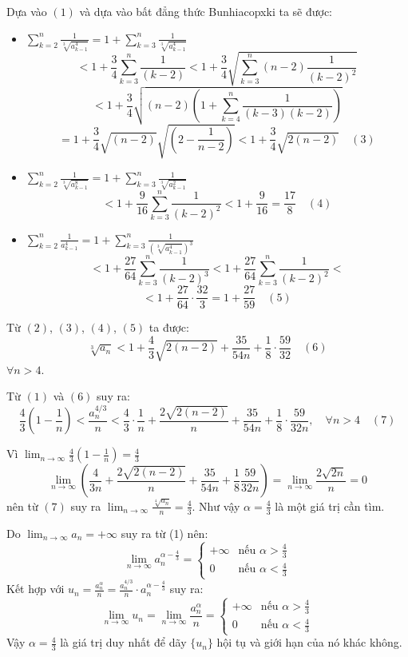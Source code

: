 \documentclass{article}
\begin{document}
Dựa vào $(1)$ và dựa vào bất đẳng thức Bunhiacopxki ta sẽ được:
\begin{itemize}
    \item $ \sum_{k=2}^{n} \frac{1}{\sqrt[3]{a_{k-1}^4}} = 1 + \sum_{k=3}^{n} \frac{1}{\sqrt[3]{a_{k-1}^4}} $
    $$ < 1 + \frac{3}{4}\sum_{k=3}^{n} \frac{1}{(k-2)} < 1 + \frac{3}{4}  \sqrt{\sum_{k=3}^{n} (n-2) \frac{1}{(k-2)^2}} $$
    $$ < 1 + \frac{3}{4} \sqrt{(n-2)(1 + \sum_{k=4}^{n} \frac{1}{(k-3)(k-2)})} $$
    $$ = 1 + \frac{3}{4} \sqrt{(n-2)} \sqrt{(2 - \frac{1}{n-2})} < 1 + \frac{3}{4} \sqrt{2(n-2)} \quad (3) $$

    \item $ \sum_{k=2}^{n} \frac{1}{\sqrt[3]{a_{k-1}^8}} = 1 + \sum_{k=3}^{n} \frac{1}{\sqrt[3]{a_{k-1}^2}} $
    $$ < 1 + \frac{9}{16} \sum_{k=3}^{n} \frac{1}{(k-2)^2} < 1 + \frac{9}{16} = \frac{17}{8} \quad (4) $$

    \item $ \sum_{k=2}^{n} \frac{1}{a_{k-1}^4} = 1 + \sum_{k=3}^{n} \frac{1}{(\sqrt[3]{a_{k-1}^4})^3} $
    $$ < 1 + \frac{27}{64} \sum_{k=3}^{n} \frac{1}{(k-2)^3} < 1 + \frac{27}{64} \sum_{k=3}^{n} \frac{1}{(k-2)^2} < $$
    $$ < 1 + \frac{27}{64} \cdot \frac{32}{3} = 1 + \frac{27}{59} \quad (5) $$
\end{itemize}

Từ $(2)$, $(3)$, $(4)$, $(5)$ ta được:
$$ \sqrt[3]{a_n} < 1 + \frac{4}{3} \sqrt{2(n-2)} + \frac{35}{54n} + \frac{1}{8} \cdot \frac{59}{32} \quad (6) $$
$\forall n > 4$.

Từ $(1)$ và $(6)$ suy ra:
$$ \frac{4}{3} \left(1 - \frac{1}{n}\right) < \frac{a_n^{4/3}}{n} < \frac{4}{3} \cdot \frac{1}{n} + \frac{2\sqrt{2(n-2)}}{n} + \frac{35}{54n} + \frac{1}{8} \cdot \frac{59}{32n}, \quad \forall n > 4 \quad (7) $$

Vì $\lim_{n \to \infty} \frac{4}{3} \left(1 - \frac{1}{n}\right) = \frac{4}{3}$
$$ \lim_{n \to \infty} \left(\frac{4}{3n} + \frac{2\sqrt{2(n-2)}}{n} + \frac{35}{54n} + \frac{1}{8} \frac{59}{32n}\right) = \lim_{n \to \infty} \frac{2\sqrt{2n}}{n} = 0 $$
nên từ $(7)$ suy ra $\lim_{n \to \infty} \frac{\sqrt[4]{a_n}}{n} = \frac{4}{3}$.
Như vậy $\alpha = \frac{4}{3}$ là một giá trị cần tìm.



Do $\lim_{n \to \infty} a_n = +\infty$ suy ra từ (1) nên:
$$ \lim_{n \to \infty} a_n^{\alpha - \frac{4}{3}} = \begin{cases} +\infty & \text{nếu } \alpha > \frac{4}{3} \\ 0 & \text{nếu } \alpha < \frac{4}{3} \end{cases} $$
Kết hợp với $u_n = \frac{a_n^\alpha}{n} = \frac{a_n^{4/3}}{n} \cdot a_n^{\alpha - \frac{4}{3}}$ suy ra:
$$ \lim_{n \to \infty} u_n = \lim_{n \to \infty} \frac{a_n^\alpha}{n} = \begin{cases} +\infty & \text{nếu } \alpha > \frac{4}{3} \\ 0 & \text{nếu } \alpha < \frac{4}{3} \end{cases} $$
Vậy $\alpha = \frac{4}{3}$ là giá trị duy nhất để dãy $\{u_n\}$ hội tụ và giới hạn của nó khác không.
\end{document}

